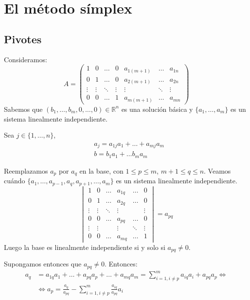 \chapter{El método símplex}
\section{Pivotes}
Consideramos:
$$A = \begin{pmatrix}
        1      & 0      & \dots  & 0      & a_{1(m+1)} & \dots  & a_{1n} \\
        0      & 1      & \dots  & 0      & a_{2(m+1)} & \dots  & a_{2n} \\
        \vdots & \vdots & \ddots & \vdots & \vdots     & \ddots & \vdots \\
        0      & 0      & \dots  & 1      & a_{m(m+1)} & \dots  & a_{mn}
    \end{pmatrix}$$
Sabemos que $(b_1, \dots, b_m, 0, \dots, 0) \in \mathbb{R}^n$ es una solución básica y $\{a_1, \dots, a_m\}$ es un sistema linealmente independiente.

Sea $j \in \{1, \dots, n\}$,
\begin{align*}
     & a_j = a_{1j}a_1 + \dots + a_{mj}a_m \\
     & b = b_1a_1 + \dots b_ma_m
\end{align*}

Reemplazamos $a_p$ por $a_q$ en la base, con $1 \leq p \leq m$, $m+1 \leq q \leq n$.
Veamos cuándo $\{a_1, \dots, a_{p-1}, a_q, a_{p+1}, \dots, a_m\}$ es un sistema linealmente independiente.
$$\begin{vmatrix}
        1      & 0      & \dots  & a_{1q} & \dots  & 0      \\
        0      & 1      & \dots  & a_{2q} & \dots  & 0      \\
        \vdots & \vdots & \ddots & \vdots &        & \vdots \\
        0      & 0      & \dots  & a_{pq} & \dots  & 0      \\
        \vdots & \vdots &        & \vdots & \ddots & \vdots \\
        0      & 0      & \dots  & a_{mq} & \dots  & 1
    \end{vmatrix} = a_{pq}$$
Luego la base es linealmente independiente si y solo si $a_{pq} \neq 0$.

Supongamos entonces que $a_{pq} \neq 0$.
Entonces:
\begin{align*}
    a_q & = a_{1q}a_1 + \dots + a_{pq}a_p + \dots + a_{mq}a_m = \sum_{i=1, i \neq p}^m a_{iq}a_i + a_{pq}a_p \Leftrightarrow \\
        & \Leftrightarrow a_p = \frac{a_q}{a_{pq}} - \sum_{i=1, i \neq p}^m \frac{a_{iq}}{a_{pq}}a_i
\end{align*}

